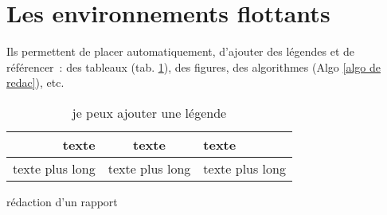 \documentclass[]{article}
\begin{document}
\section{Les environnements flottants}
Ils permettent de placer automatiquement, d'ajouter des légendes et de référencer~: des tableaux (tab. \ref{mon tableau}), des figures, des algorithmes (Algo \ref{algo de redac}), etc.

\begin{table}
\begin{center}
\begin{tabular}{r|c|l|}
 texte & texte & texte \\
\hline
 texte plus long & texte plus long & texte plus long \\
\hline
\end{tabular}
\end{center}
\caption{je peux ajouter une légende \label{mon tableau}}
\end{table}

\begin{algorithm}
\caption{rédaction d'un rapport \label{algo de redac}} 
\end{algorithm}


% 
% 
\end{document}
